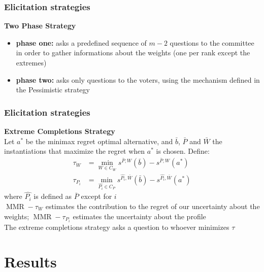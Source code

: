 \documentclass{beamer}
\DeclareMathOperator{\MMR}{MMR}
\begin{document}
	\begin{frame}[t]
		\frametitle{Elicitation strategies}
		\textbf{Two Phase Strategy} \\
		\bigskip
		\begin{itemize}
			\item <2-> \textbf{phase one:} asks a predefined sequence of $m - 2$ questions to the committee in order to gather informations about the weights (one per rank except the extremes)
			\item <3-> \textbf{phase two:} asks only questions to the voters, using the mechanism defined in the Pessimistic strategy
		\end{itemize}
	\end{frame}
	
	\begin{frame}[t]
		\frametitle{Elicitation strategies}
		\textbf{Extreme Completions Strategy} \\
		\medskip
		\onslide<2-> Let $a^{*}$ be the minimax regret optimal alternative, and $\bar{b}$, $\bar{P}$ and $\bar{W}$ the instantiations that maximize the regret when $a^*$ is chosen. \onslide<3-> Define: 
		\begin{align*}
		\tau_{W} & = \min_{W \in C_W} s^{\bar{P},W}(\bar{b}) - s^{\bar{P},W}(a^{*}) \\
		\tau_{P_i} & = \min_{\hat{P_i} \in C_P} s^{\hat{P_i},\bar{W}}(\bar{b}) -  s^{\hat{P_i},\bar{W}}(a^{*})
		\end{align*}
		where $\hat{P_i}$ is defined as $\bar{P}$ except for $i$ \\
		\bigskip
		\onslide<4->
		$\MMR - \tau_{W}$ estimates the contribution to the regret of our uncertainty about the weights; $\MMR - \tau_{P_i}$ estimates the uncertainty about the profile
		\\ \bigskip
		\onslide<5-> The extreme completions strategy asks a question to whoever minimizes $\tau$
	\end{frame}
	
	\section{Results}
\end{document}
